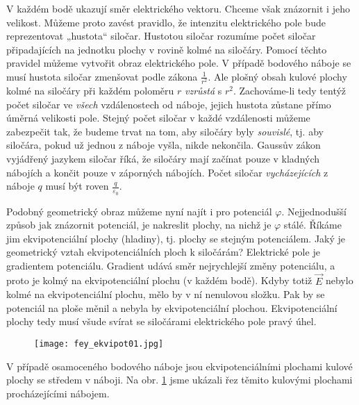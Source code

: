     V každém bodě ukazují směr elektrického vektoru. Chceme však znázornit i jeho velikost. Můžeme 
    proto zavést pravidlo, že intenzitu elektrického pole bude reprezentovat „hustota“ siločar. 
    Hustotou siločar rozumíme počet siločar připadajících na jednotku plochy v rovině kolmé na 
    siločáry. Pomocí těchto pravidel můžeme vytvořit obraz elektrického pole. V případě bodového 
    náboje se musí hustota siločar zmenšovat podle zákona \(\frac{1}{r^2}\). Ale plošný obsah kulové 
    plochy kolmé na siločáry při každém poloměru \(r\) \emph{vzrůstá} s \(r^2\). Zachováme-li tedy 
    tentýž počet siločar ve \emph{všech} vzdálenostech od náboje, jejich hustota zůstane přímo 
    úměrná velikosti pole. Stejný počet siločar v každé vzdálenosti můžeme zabezpečit tak, že budeme 
    trvat na tom, aby siločáry byly \emph{souvislé}, tj. aby siločára, pokud už jednou z náboje 
    vyšla, nikde nekončila. Gaussův zákon vyjádřený jazykem siločar říká, že siločáry mají začínat 
    pouze v kladných nábojích a končit pouze v záporných nábojích. Počet siločar 
    \emph{vycházejících} z náboje \(q\) musí být roven \(\frac{q}{\varepsilon_0}\).
    
    Podobný geometrický obraz můžeme nyní najít i pro potenciál \(\varphi\). Nejjednodušší způsob 
    jak znázornit potenciál, je nakreslit plochy, na nichž je \(\varphi\) stálé. Říkáme jim 
    ekvipotenciální plochy (hladiny), tj. plochy se stejným potenciálem. Jaký je geometrický vztah 
    ekvipotenciálních ploch k siločárám? Elektrické pole je gradientem potenciálu. Gradient udává 
    směr nejrychlejší změny potenciálu, a proto je kolmý na ekvipotenciální plochu (v každém bodě). 
    Kdyby totiž \(\vec{E}\) nebylo kolmé na ekvipotenciální plochu, mělo by v ní nenulovou složku. 
    Pak by se potenciál na ploše měnil a nebyla by ekvipotenciální plochou. Ekvipotenciální plochy 
    tedy musí všude svírat se siločárami elektrického pole pravý úhel.    
    \begin{figure}[ht!]
      \texttt{[image: fey\_ekvipot01.jpg]}
      \label{fyz:fig_fey_ekvipot01}  
    \end{figure}
    
    V případě osamoceného bodového náboje jsou ekvipotenciálními plochami kulové plochy se středem v 
    náboji. Na obr. \ref{fyz:fig_fey_ekvipot01} jsme ukázali řez těmito kulovými plochami 
    procházejícími nábojem.
    
